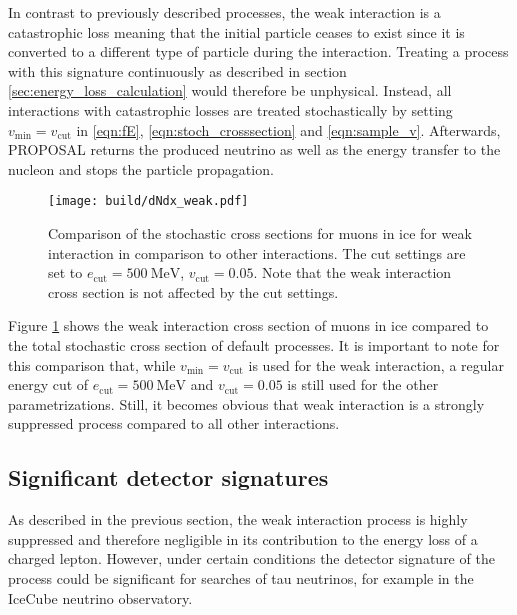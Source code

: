 In contrast to previously described processes, the weak interaction is a catastrophic loss meaning that the initial particle ceases to exist since it is converted to a different type of particle during the interaction.
Treating a process with this signature continuously as described in section \ref{sec:energy_loss_calculation} would therefore be unphysical.
Instead, all interactions with catastrophic losses are treated stochastically by setting $v_{\text{min}} = v_{\text{cut}}$ in \eqref{eqn:fE}, \eqref{eqn:stoch_crosssection} and \eqref{eqn:sample_v}.
Afterwards, PROPOSAL returns the produced neutrino as well as the energy transfer to the nucleon and stops the particle propagation.

\begin{figure}
    \centering
    \texttt{[image: build/dNdx\_weak.pdf]}
    \caption{Comparison of the stochastic cross sections for muons in ice for weak interaction in comparison to other interactions. The cut settings are set to $e_\text{cut} = \SI{500}{\mega\electronvolt}$, $v_\text{cut} = 0.05$. Note that the weak interaction cross section is not affected by the cut settings.}
    \label{fig:dNdx_weak}
\end{figure}

Figure \ref{fig:dNdx_weak} shows the weak interaction cross section of muons in ice compared to the total stochastic cross section of default processes.
It is important to note for this comparison that, while $v_{\text{min}} = v_{\text{cut}}$ is used for the weak interaction, a regular energy cut of $e_\text{cut} = \SI{500}{\mega\electronvolt}$ and $v_\text{cut} = 0.05$ is still used for the other parametrizations.
Still, it becomes obvious that weak interaction is a strongly suppressed process compared to all other interactions.

\subsection{Significant detector signatures}
\label{sec:weak_signature}

As described in the previous section, the weak interaction process is highly suppressed and therefore negligible in its contribution to the energy loss of a charged lepton.
However, under certain conditions the detector signature of the process could be significant for searches of tau neutrinos, for example in the IceCube neutrino observatory.

